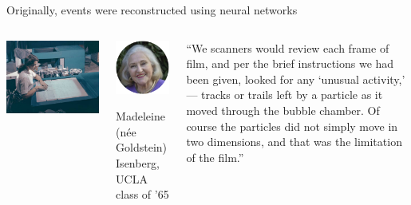 \documentclass[aspectratio=169]{beamer}
\begin{document}
\begin{frame}{Originally, events were reconstructed using neural networks}
\vspace{0.25 cm}
\begin{columns}
\includegraphics[width=\linewidth]{PLOTS/scanner-alvarez-lab-2.jpg}


\vspace{-1 cm}
\begin{center}
\includegraphics[width=0.5\linewidth]{PLOTS/madeleine-isenberg-SCANNER.png}

\scriptsize
Madeleine (n\'ee Goldstein) Isenberg, UCLA class of '65
\end{center}

\begin{minipage}{\linewidth}
\scriptsize
``We scanners would review each frame of film, and per the brief instructions we had been given, looked for any `unusual activity,' --- tracks or trails left by a particle as it moved through the bubble chamber. Of course the particles did not simply move in two dimensions, and that was the limitation of the film.''


\end{minipage}
\end{columns}
\end{frame}
\end{document}
